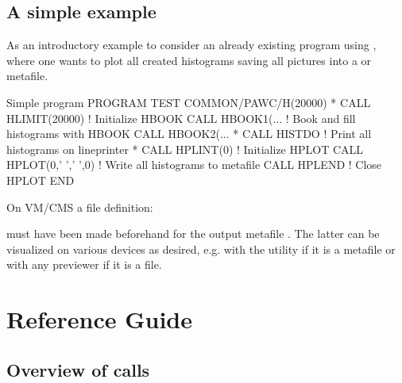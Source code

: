 \section{A simple example}
As an introductory example to \HPLOT{} consider an already existing program
using \HBOOK, where one wants to plot all created histograms saving all pictures
into a \GKS{} or \PS{} metafile.
\begin{XMPt}{Simple \HPLOT{} program}
       PROGRAM TEST
       COMMON/PAWC/H(20000)
*
       CALL HLIMIT(20000)         ! Initialize HBOOK
       CALL HBOOK1(...            ! Book and fill histograms with HBOOK
       CALL HBOOK2(...
*
       CALL HISTDO                ! Print all histograms on lineprinter
*
       CALL HPLINT(0)             ! Initialize HPLOT
       CALL HPLOT(0,' ',' ',0)    ! Write all histograms to metafile
       CALL HPLEND                ! Close HPLOT
       END
\end{XMPt}
On VM/CMS a file definition:
\par
{}
\par
must have been made beforehand for the output metafile .
The latter can be visualized on various devices as desired, e.g. with
the  utility if it is a \GKS{} metafile or with any \PS{}
previewer if it is a \PS{} file.

\chapter{Reference Guide}

\section{Overview of \protect\HPLOT{} calls}

